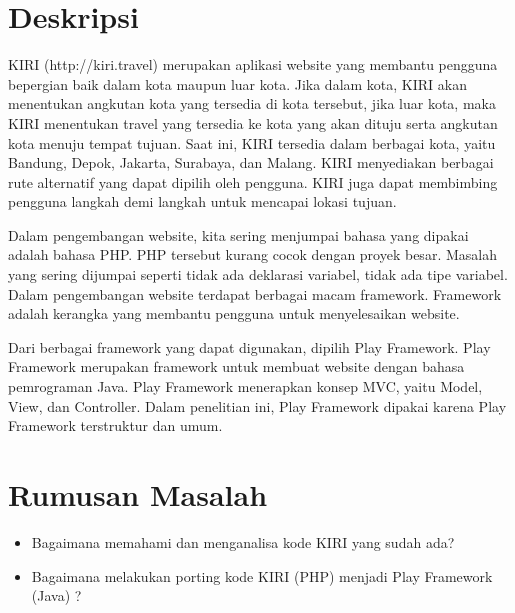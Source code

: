 \documentclass[a4paper,twoside]{article}
\begin{document}
\title{\@judultopik}
\author{\nama \textendash \@npm} 

\newcommand{\nama}{Steven Sutana}
\newcommand{\@npm}{2012730046}
\newcommand{\@judultopik}{Porting PHP menjadi Play Framework (Studi Kasus : KIRI \textit{Front-End})} %
\newcommand{\jumpemb}{1} %
\newcommand{\tanggal}{26/08/2015} %
\maketitle


\section{Deskripsi}

KIRI (http://kiri.travel) merupakan aplikasi website yang membantu pengguna bepergian baik dalam kota maupun luar kota. Jika dalam kota, KIRI akan menentukan angkutan kota yang tersedia di kota tersebut, jika luar kota, maka KIRI menentukan travel yang tersedia ke kota yang akan dituju serta angkutan kota menuju tempat tujuan. Saat ini, KIRI tersedia dalam berbagai kota, yaitu Bandung, Depok, Jakarta, Surabaya, dan Malang. KIRI menyediakan berbagai rute alternatif yang dapat dipilih oleh pengguna. KIRI juga dapat membimbing pengguna langkah demi langkah untuk mencapai lokasi tujuan. 

Dalam pengembangan website, kita sering menjumpai bahasa yang dipakai adalah bahasa PHP. PHP tersebut kurang cocok dengan proyek besar. Masalah yang sering dijumpai seperti tidak ada deklarasi variabel, tidak ada tipe variabel. Dalam pengembangan website terdapat berbagai macam framework. Framework adalah kerangka yang membantu pengguna untuk menyelesaikan website. 

Dari berbagai framework yang dapat digunakan, dipilih Play Framework. Play Framework merupakan framework untuk membuat website dengan bahasa pemrograman Java. Play Framework menerapkan konsep MVC, yaitu Model, View, dan Controller. Dalam penelitian ini, Play Framework dipakai karena Play Framework terstruktur dan umum. 

\section{Rumusan Masalah}
\begin{itemize}
	\item Bagaimana memahami dan menganalisa kode KIRI yang sudah ada?
	\item Bagaimana melakukan porting kode KIRI (PHP) menjadi Play Framework (Java) ?
\end{itemize}
\end{document}
